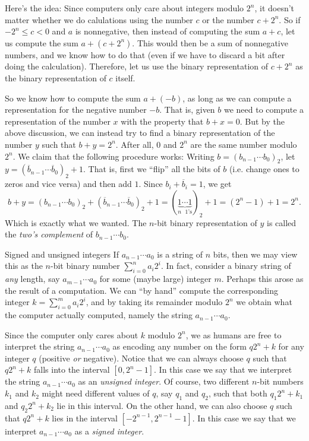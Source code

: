 \documentclass[article, a4paper, 11pt, oneside]{memoir}
\numberwithin{equation}{chapter}
\begin{document}
\begin{notelist}
Here's the idea: Since computers only care about integers modulo $2^n$, it doesn't matter whether we do calulations using the number $c$ or the number $c + 2^n$. So if $-2^n \leq c < 0$ and $a$ is nonnegative, then instead of computing the sum $a + c$, let us compute the sum $a + (c + 2^n)$. This would then be a sum of nonnegative numbers, and we know how to do that (even if we have to discard a bit after doing the calculation). Therefore, let us use the binary representation of $c + 2^n$ as the binary representation of $c$ itself.

So we know how to compute the sum $a + (-b)$, as long as we can compute a representation for the negative number $-b$. That is, given $b$ we need to compute a representation of the number $x$ with the property that $b + x = 0$. But by the above discussion, we can instead try to find a binary representation of the number $y$ such that $b + y = 2^n$. After all, $0$ and $2^n$ are the same number modulo $2^n$. We claim that the following procedure works: Writing $b = (b_{n-1} \cdots b_0)_2$, let $y = (\overline{b}_{n-1} \cdots \overline{b}_0)_2 + 1$. That is, first we \enquote{flip} all the bits of $b$ (i.e. change ones to zeros and vice versa) and then add $1$. Since $b_i + \overline{b}_i = 1$, we get
%
\begin{equation*}
    b + y
        = (b_{n-1} \cdots b_0)_2 + (\overline{b}_{n-1} \cdots \overline{b}_0)_2 + 1
        = (\underbrace{1 \cdots 1}_{\text{$n$ $1$'s}})_2 + 1
        = (2^n - 1) + 1
        = 2^n.
\end{equation*}
%
Which is exactly what we wanted. The $n$-bit binary representation of $y$ is called the \emph{two's complement} of $b_{n-1} \cdots b_0$.

\item[Signed and unsigned integers]
If $a_{n-1} \cdots a_0$ is a string of $n$ bits, then we may view this as the $n$-bit binary number $\sum_{i=0}^n a_i 2^i$. In fact, consider a binary string of \emph{any} length, say $a_{m-1} \cdots a_0$ for some (maybe large) integer $m$. Perhaps this arose as the result of a computation. We can \enquote{by hand} compute the corresponding integer $k = \sum_{i=0}^m a_i 2^i$, and by taking its remainder modulo $2^n$ we obtain what the computer actually computed, namely the string $a_{n-1} \cdots a_0$.

Since the computer only cares about $k$ modulo $2^n$, we as humans are free to interpret the string $a_{n-1} \cdots a_0$ as encoding any number on the form $q 2^n + k$ for any integer $q$ (positive \emph{or} negative). Notice that we can always choose $q$ such that $q 2^n + k$ falls into the interval $[0, 2^n - 1]$. In this case we say that we interpret the string $a_{n-1} \cdots a_0$ as an \emph{unsigned integer}. Of course, two different $n$-bit numbers $k_1$ and $k_2$ might need different values of $q$, say $q_1$ and $q_2$, such that both $q_1 2^n + k_1$ and $q_2 2^n + k_2$ lie in this interval. On the other hand, we can also choose $q$ such that $q 2^n + k$ lies in the interval $[-2^{n-1}, 2^{n-1} - 1]$. In this case we say that we interpret $a_{n-1} \cdots a_0$ as a \emph{signed integer}.


\end{notelist}
\end{document}
